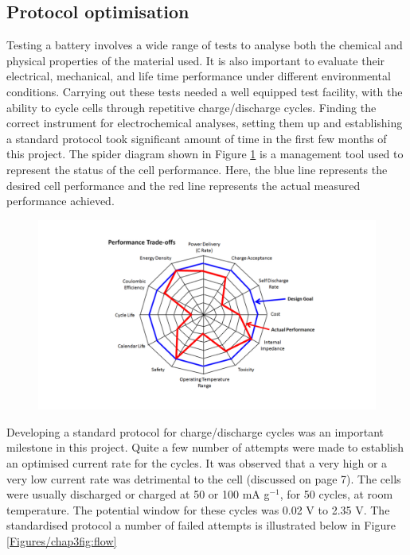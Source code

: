 \subsection*{Protocol optimisation}
Testing a battery involves a wide range of tests to analyse both the chemical and physical properties of the material used. It is also important to evaluate their electrical, mechanical, and life time performance under different environmental conditions.
Carrying out these tests needed a well equipped test facility, with the ability to cycle cells through repetitive charge/discharge cycles. Finding the correct instrument for electrochemical analyses, setting them up and establishing a standard protocol took significant amount of time in the first few months of this project.
The spider diagram shown in Figure \ref{Figures/chap3fig:perf} is a management tool used to represent the status of the cell performance. Here, the blue line represents the desired cell performance and the red line represents the actual measured performance achieved.

\begin{figure}[tbh!]
\centering
\includegraphics[width=\textwidth]{Figures/chap3fig/perf.pdf}
\caption{}
\label{Figures/chap3fig:perf}
\end{figure}

Developing a standard protocol for charge/discharge cycles was an important milestone in this project. Quite a few number of attempts were made to establish an optimised current rate for the cycles. It was observed that a very high or a very low current rate was detrimental to the cell (discussed on page 7). The cells were usually discharged or charged at 50 or 100 mA g$^{-1}$, for 50 cycles, at room temperature. The potential window for these cycles was 0.02 V to 2.35 V. 
The standardised protocol a number of failed attempts is illustrated below in Figure \ref{Figures/chap3fig:flow}

